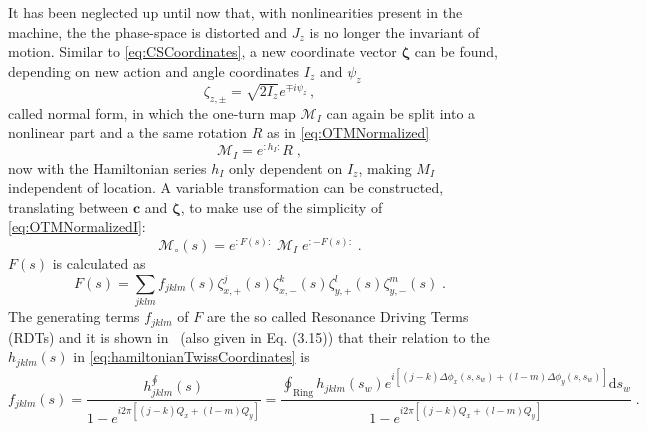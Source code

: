 It has been neglected up until now that, with nonlinearities present in the machine,
the the phase-space is distorted and $J_z$ is no longer the invariant of motion.
Similar to \cref{eq:CSCoordinates}, a new coordinate vector $\bm{\zeta}$ can be found, 
depending on new action and angle coordinates $I_z$ and $\psi_z$
%
\begin{equation}
    \label{eq:NFCoordinates}
    \zeta_{z,\pm} = \sqrt{2I_z}e^{\mp i \psi_z} \, ,
\end{equation}
%
called normal form,
in which the one-turn map $\mathcal{M}_I$ can again be split into a nonlinear part 
and a the same rotation $R$ as in \cref{eq:OTMNormalized}
%
\begin{equation}
    \label{eq:OTMNormalizedI}
    \mathcal{M}_I = e^{:h_I:}R  \; ,
\end{equation}
%
now with the Hamiltonian series $h_I$ only dependent on $I_z$, making $M_I$ independent of location.
A variable transformation can be constructed,
translating between $\bm{c}$ and $\bm{\zeta}$, 
to make use of the simplicity of \cref{eq:OTMNormalizedI}:
\begin{equation}
    \label{eq:NormalFormTransformation}
    \mathcal{M}_\circ(s) = e^{:F(s):} \;  \mathcal{M}_I \; e^{:-F(s):} \; .
\end{equation}
%
$F(s)$ is calculated as 
%
\begin{equation}
    \label{eq:NormalFormGeneratingFunction}
    F(s) = \sum\limits_{jklm} f_{jklm}(s)  \zeta_{x,+}^j(s) \zeta_{x,-}^k(s)  \zeta_{y,+}^l(s)  \zeta_{y,-}^m(s) 
    \; .
\end{equation}
% 
The generating terms $f_{jklm}$ of $F$ are the so called Resonance Driving Terms (RDTs) and it is shown 
in~\cite{ForestHamiltonianFreeDescription1990} (also given in \cite{FranchiStudiesMeasurementsLinear2006} Eq. (3.15)) 
that their relation to the $h_{jklm}(s)$ in \cref{eq:hamiltonianTwissCoordinates} is
%
\begin{equation}
    \label{eq:RDTHamiltonianRelation}
    f_{jklm}(s) = 
    \frac{h^{\oint}_{jklm}(s)}{1 - e^{i2\pi[(j-k)Q_x + (l-m)Q_y]}}  = 
    \frac{ 
    \oint_\text{Ring} h_{jklm}(s_w) 
    e^{i\left[(j-k)\Delta \phi_x(s, s_w) + (l-m)\Delta \phi_{y}(s, s_w)\right]} \mathrm{d}s_w
    }{1 - e^{i2\pi[(j-k)Q_x + (l-m)Q_y]}}
    \;.
\end{equation}
